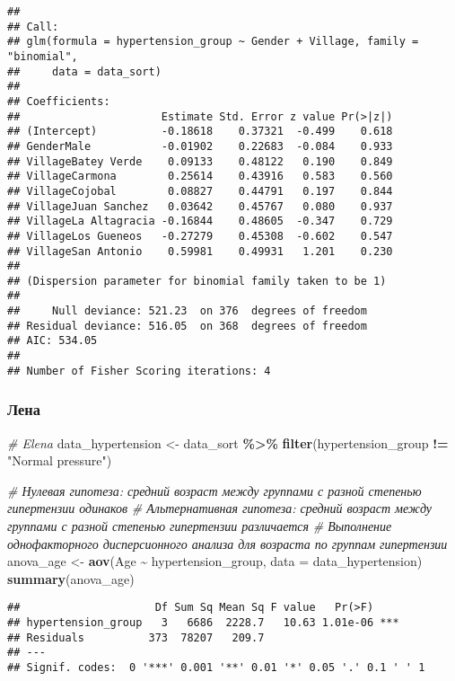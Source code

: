 \documentclass[
]{article}
\newenvironment{Shaded}{\begin{snugshade}}{\end{snugshade}}
\newcommand{\AttributeTok}[1]{\textcolor[rgb]{0.13,0.29,0.53}{#1}}
\newcommand{\CommentTok}[1]{\textcolor[rgb]{0.56,0.35,0.01}{\textit{#1}}}
\newcommand{\FunctionTok}[1]{\textcolor[rgb]{0.13,0.29,0.53}{\textbf{#1}}}
\newcommand{\NormalTok}[1]{#1}
\newcommand{\OtherTok}[1]{\textcolor[rgb]{0.56,0.35,0.01}{#1}}
\newcommand{\SpecialCharTok}[1]{\textcolor[rgb]{0.81,0.36,0.00}{\textbf{#1}}}
\newcommand{\StringTok}[1]{\textcolor[rgb]{0.31,0.60,0.02}{#1}}
\begin{document}
\begin{verbatim}
## 
## Call:
## glm(formula = hypertension_group ~ Gender + Village, family = "binomial", 
##     data = data_sort)
## 
## Coefficients:
##                      Estimate Std. Error z value Pr(>|z|)
## (Intercept)          -0.18618    0.37321  -0.499    0.618
## GenderMale           -0.01902    0.22683  -0.084    0.933
## VillageBatey Verde    0.09133    0.48122   0.190    0.849
## VillageCarmona        0.25614    0.43916   0.583    0.560
## VillageCojobal        0.08827    0.44791   0.197    0.844
## VillageJuan Sanchez   0.03642    0.45767   0.080    0.937
## VillageLa Altagracia -0.16844    0.48605  -0.347    0.729
## VillageLos Gueneos   -0.27279    0.45308  -0.602    0.547
## VillageSan Antonio    0.59981    0.49931   1.201    0.230
## 
## (Dispersion parameter for binomial family taken to be 1)
## 
##     Null deviance: 521.23  on 376  degrees of freedom
## Residual deviance: 516.05  on 368  degrees of freedom
## AIC: 534.05
## 
## Number of Fisher Scoring iterations: 4
\end{verbatim}

\subsubsection{Лена}\label{ux43bux435ux43dux430}

\begin{Shaded}
\begin{Highlighting}[]
\CommentTok{\# Elena}
\NormalTok{data\_hypertension }\OtherTok{\textless{}{-}}\NormalTok{ data\_sort }\SpecialCharTok{\%\textgreater{}\%}
  \FunctionTok{filter}\NormalTok{(hypertension\_group }\SpecialCharTok{!=} \StringTok{"Normal pressure"}\NormalTok{)}

\CommentTok{\# Нулевая гипотеза: средний возраст между группами с разной степенью гипертензии одинаков}
\CommentTok{\# Альтернативная гипотеза: средний возраст между группами с разной степенью гипертензии различается}
\CommentTok{\# Выполнение однофакторного дисперсионного анализа для возраста по группам гипертензии}
\NormalTok{anova\_age }\OtherTok{\textless{}{-}} \FunctionTok{aov}\NormalTok{(Age }\SpecialCharTok{\textasciitilde{}}\NormalTok{ hypertension\_group, }\AttributeTok{data =}\NormalTok{ data\_hypertension)}
\FunctionTok{summary}\NormalTok{(anova\_age)}
\end{Highlighting}
\end{Shaded}

\begin{verbatim}
##                     Df Sum Sq Mean Sq F value   Pr(>F)    
## hypertension_group   3   6686  2228.7   10.63 1.01e-06 ***
## Residuals          373  78207   209.7                     
## ---
## Signif. codes:  0 '***' 0.001 '**' 0.01 '*' 0.05 '.' 0.1 ' ' 1
\end{verbatim}
\end{document}
